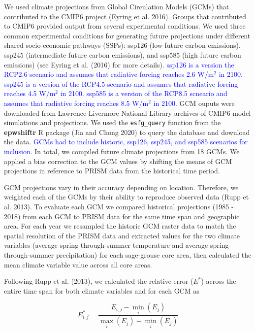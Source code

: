 \documentclass[
  12pt,
]{article}
\begin{document}
We used climate projections from Global Circulation Models (GCMs) that contributed to the CMIP6 project (Eyring et al. 2016).
Groups that contributed to CMIP6 provided output from several experimental conditions.
We used three common experimental conditions for generating future projections under different shared socio-economic pathways (SSPs): ssp126 (low future carbon emissions), ssp245 (intermediate future carbon emissions), and ssp585 (high future carbon emissions) (see Eyring et al. (2016) for more details).
\textcolor{blue}{ssp126 is a version the RCP2.6 scenario and assumes that radiative forcing reaches 2.6 W/m$^2$ in 2100.}
\textcolor{blue}{ssp245 is a version of the RCP4.5 scenario and assumes that radiative forcing reaches 4.5 W/m$^2$ in 2100.}
\textcolor{blue}{ssp585 is a version of the RCP8.5 scneario and assumes that radiative forcing reaches 8.5 W/m$^2$ in 2100.}
GCM ouputs were downloaded from Lawrence Livermore National Library archives of CMIP6 model simulations and projections.
We used the \texttt{esfg\_query} function from the \textbf{epwshiftr} R package (Jia and Chong 2020) to query the database and download the data.
\textcolor{blue}{GCMs had to include historic, ssp126, ssp245, and ssp585 scenarios for inclusion.}
In total, we compiled future climate projections from 18 GCMs.
We applied a bias correction to the GCM values by shifting the means of GCM projections in reference to PRISM data from the historical time period.

GCM projections vary in their accuracy depending on location.
Therefore, we weighted each of the GCMs by their ability to reproduce observed data (Rupp et al. 2013).
To evaluate each GCM we compared historical projections (1985 - 2018) from each GCM to PRISM data for the same time span and geographic area.
For each year we resampled the historic GCM raster data to match the spatial resolution of the PRISM data and extracted values for the two climate variables (average spring-through-summer temperature and average spring-through-summer precipitation) for each sage-grouse core area, then calculated the mean climate variable value across all core areas.

Following Rupp et al. (2013), we calculated the relative error (\(E^*\)) across the entire time span for both climate variables and for each GCM as

\begin{equation}
E_{i,j}^* = \frac{E_{i,j} - \min\limits_{i}(E_{j})}{\max\limits_{i}(E_{j}) - \min\limits_i(E_{j})}
\end{equation}
\end{document}
